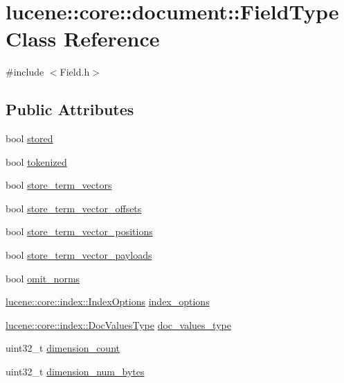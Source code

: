 \hypertarget{classlucene_1_1core_1_1document_1_1FieldType}{}\section{lucene\+:\+:core\+:\+:document\+:\+:Field\+Type Class Reference}
\label{classlucene_1_1core_1_1document_1_1FieldType}


{\ttfamily \#include $<$Field.\+h$>$}

\subsection*{Public Attributes}
\begin{DoxyCompactItemize}
\item 
bool \mbox{\hyperlink{classlucene_1_1core_1_1document_1_1FieldType_a56b81575dbaea749036201c379034cc8}{stored}}
\item 
bool \mbox{\hyperlink{classlucene_1_1core_1_1document_1_1FieldType_abe04c4af1aafbe73f3e1a0333f08cfd8}{tokenized}}
\item 
bool \mbox{\hyperlink{classlucene_1_1core_1_1document_1_1FieldType_af8c77a78e7e5749cbff0044ad5bc94b1}{store\+\_\+term\+\_\+vectors}}
\item 
bool \mbox{\hyperlink{classlucene_1_1core_1_1document_1_1FieldType_a8aae5a6917e9d3d02c00966df5169504}{store\+\_\+term\+\_\+vector\+\_\+offsets}}
\item 
bool \mbox{\hyperlink{classlucene_1_1core_1_1document_1_1FieldType_a0c763a29f6d5b3c9b29b585935332f90}{store\+\_\+term\+\_\+vector\+\_\+positions}}
\item 
bool \mbox{\hyperlink{classlucene_1_1core_1_1document_1_1FieldType_a7e6c868f2767a9045f55239448eb56fa}{store\+\_\+term\+\_\+vector\+\_\+payloads}}
\item 
bool \mbox{\hyperlink{classlucene_1_1core_1_1document_1_1FieldType_a608b14ab36f164f6fc88fc47401dfdd8}{omit\+\_\+norms}}
\item 
\mbox{\hyperlink{namespacelucene_1_1core_1_1index_a0d5e1f98471a76de106056cf3b5a7897}{lucene\+::core\+::index\+::\+Index\+Options}} \mbox{\hyperlink{classlucene_1_1core_1_1document_1_1FieldType_ace77c2df2db83441226f4c72e7455910}{index\+\_\+options}}
\item 
\mbox{\hyperlink{namespacelucene_1_1core_1_1index_a2f7ffaef6429b5df542c8aa12f8b9883}{lucene\+::core\+::index\+::\+Doc\+Values\+Type}} \mbox{\hyperlink{classlucene_1_1core_1_1document_1_1FieldType_ac90952580a0964ee3ca3c9a8c6fe65a9}{doc\+\_\+values\+\_\+type}}
\item 
uint32\+\_\+t \mbox{\hyperlink{classlucene_1_1core_1_1document_1_1FieldType_a86df8398e9e9765cda2d2e48c2ec8cce}{dimension\+\_\+count}}
\item 
uint32\+\_\+t \mbox{\hyperlink{classlucene_1_1core_1_1document_1_1FieldType_a66764229077763f23d13537795f7efe3}{dimension\+\_\+num\+\_\+bytes}}
\end{DoxyCompactItemize}
